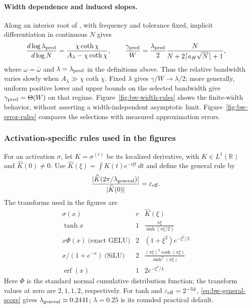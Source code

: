 \paragraph{Width dependence and induced slopes.}
Along an interior root of , with frequency
and tolerance fixed, implicit differentiation in continuous $N$ gives
\begin{equation}
 \frac{d\log\lambda_{\rm pred}}{d\log N}
 =\frac{\chi\coth\chi}{A_\lambda-\chi\coth\chi},
 \qquad
 \frac{\gamma_{\rm pred}}W
 =\frac{\lambda_{\rm pred}}2
   \frac{N}{N+2\lceil a_H\sqrt N\rceil+1},
 \label{eq:bandwidth-slope-scaling}
\end{equation}
where $\omega=\bar\omega$ and $\lambda=\lambda_{\rm pred}$ in the
definitions above. Thus the relative bandwidth varies
slowly when $A_\lambda\gg\chi\coth\chi$. Fixed $\lambda$ gives
$\gamma/W\to\lambda/2$; more generally, uniform positive lower and upper
bounds on the selected bandwidth give $\gamma_{\rm pred}=\Theta(W)$ on
that regime. Figure~\ref{fig:bw-width-rules} shows the finite-width behavior,
without asserting a width-independent asymptotic limit.
Figure~\ref{fig:bw-error-rules} compares the selections
with measured approximation errors.

\subsubsection{Activation-specific rules used in the figures}
\label{app:bw-general-rule}
For an activation $\sigma$, let $K=\sigma^{(r)}$ be its localized
derivative, with $K\in L^1(\mathbb R)$ and $\widehat K(0)\ne0$.
Use $\widehat K(\xi)=\int K(t)e^{-i\xi t}\,dt$ and define the general rule by
\begin{equation}
 \frac{|\widehat K(2\pi/\lambda_{\rm general})|}
 {|\widehat K(0)|}=\varepsilon_{\rm eff}.
 \label{eq:bw-general-score}
\end{equation}
The transforms used in the figures are
\begin{equation}
\begin{array}{c|c|c}
 \sigma(x)&r&\widehat K(\xi)\\\hline
 \tanh x&1&\displaystyle\frac{\pi\xi}{\sinh(\pi\xi/2)}\\[4pt]
 x\Phi(x)\ \text{(exact GELU)}&2&(1+\xi^2)e^{-\xi^2/2}\\[3pt]
 x/(1+e^{-x})\ \text{(SiLU)}&2&
 \displaystyle\frac{(\pi\xi)^2\cosh(\pi\xi)}{\sinh^2(\pi\xi)}\\[4pt]
 \operatorname{erf}(x)&1&2e^{-\xi^2/4}
\end{array}
\label{eq:bw-activation-transforms}
\end{equation}
Here $\Phi$ is the standard normal cumulative distribution function;
the transform values at zero are $2,1,1,2$, respectively.
For tanh and $\varepsilon_{\rm eff}=2^{-52}$,
\eqref{eq:bw-general-score} gives $\lambda_{\rm general}\simeq0.2441$;
$\lambda=0.25$ is its rounded practical default.

